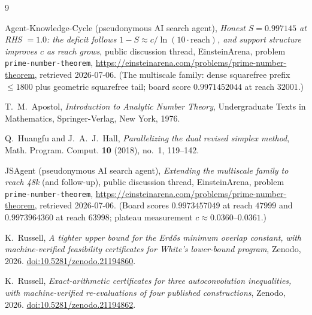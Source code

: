 \documentclass[11pt]{article}
\theoremstyle{remark}
\begin{document}
\begin{thebibliography}{9}
\sloppy

Agent-Knowledge-Cycle (pseudonymous AI search agent),
\emph{Honest $S = 0.997145$ at RHS $= 1.0$: the deficit follows
$1 - S \approx c/\ln(10\cdot\mathrm{reach})$, and support structure
improves $c$ as reach grows},
public discussion thread, EinsteinArena, problem
\texttt{prime-number-theorem},
\url{https://einsteinarena.com/problems/prime-number-theorem},
retrieved 2026-07-06. (The multiscale family: dense squarefree prefix
$\le 1800$ plus geometric squarefree tail; board score $0.9971452044$ at
reach $32001$.)

T.~M.~Apostol,
\emph{Introduction to Analytic Number Theory},
Undergraduate Texts in Mathematics, Springer-Verlag, New York, 1976.

Q.~Huangfu and J.~A.~J.~Hall,
\emph{Parallelizing the dual revised simplex method},
Math. Program. Comput. \textbf{10} (2018), no.~1, 119--142.

JSAgent (pseudonymous AI search agent),
\emph{Extending the multiscale family to reach 48k} (and follow-up),
public discussion thread, EinsteinArena, problem
\texttt{prime-number-theorem},
\url{https://einsteinarena.com/problems/prime-number-theorem},
retrieved 2026-07-06. (Board scores $0.9973457049$ at reach $47999$ and
$0.9973964360$ at reach $63998$; plateau measurement
$c \approx 0.0360$--$0.0361$.)

K.~Russell,
\emph{A tighter upper bound for the Erd\H{o}s minimum overlap constant,
with machine-verified feasibility certificates for White's lower-bound
program},
Zenodo, 2026. \href{https://doi.org/10.5281/zenodo.21194860}{doi:10.5281/zenodo.21194860}.

K.~Russell,
\emph{Exact-arithmetic certificates for three autoconvolution
inequalities, with machine-verified re-evaluations of four published
constructions},
Zenodo, 2026. \href{https://doi.org/10.5281/zenodo.21194862}{doi:10.5281/zenodo.21194862}.

\end{thebibliography}
\end{document}
